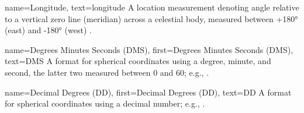 {
  name={Longitude},
  text={longitude}
}
{
  A location measurement denoting angle relative to a
  vertical zero line (meridian) across a celestial body,
  measured between +\ang{180} (east) and -\ang{180} (west)
  \parencite{coordSystems}.
}

{
  name={Degrees Minutes Seconds (DMS)},
  first={Degrees Minutes Seconds (DMS)},
  text={DMS}
}
{
  A format for spherical coordinates using a degree, minute,
  and second, the latter two measured between 0 and 60;
  e.g.,  \parencite{coordSystems}. 
}

{
  name={Decimal Degrees (DD)},
  first={Decimal Degrees (DD)},
  text={DD}
}
{
  A format for spherical coordinates using a decimal number;
  e.g.,  \parencite{coordSystems}. 
}